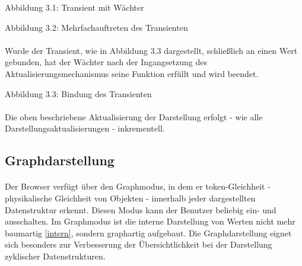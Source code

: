 \documentclass[12pt,a4paper]{article}
\begin{document}
\begin{center}
\linebreak 
Abbildung 3.1: Transient mit W\"{a}chter
\end{center}

\begin{center}
\linebreak 
Abbildung 3.2: Mehrfachauftreten des Transienten
\end{center}

\paragraph{}

Wurde der Transient, wie in Abbildung 3.3 dargestellt, schlie\ss lich
an einen Wert gebunden, hat der W\"achter nach der Ingangsetzung des
Aktualisierungsmechanismus seine Funktion erf\"ullt und
wird beendet.

\begin{center}
\linebreak 
Abbildung 3.3: Bindung des Transienten
\end{center}

\paragraph{}

Die oben beschriebene Aktualisierung der Darstellung erfolgt -
wie alle Darstellungsaktualisierungen - inkrementell. 



\subsection{Graphdarstellung}

\paragraph{}

Der Browser verf\"ugt \"uber den Graphmodus, in dem er token-Gleichheit -
physikalische Gleichheit von Objekten - innerhalb jeder dargestellten
Datenstruktur erkennt. Diesen Modus kann der Benutzer beliebig ein- und
ausschalten. Im Graphmodus ist die interne Darstellung von Werten 
nicht mehr baumartig \ref{intern}, sondern graphartig aufgebaut.
Die Graphdarstellung eignet sich besonders zur Verbesserung der
\"Ubersichtlichkeit bei der Darstellung zyklischer Datenstrukturen. 
\end{document}
